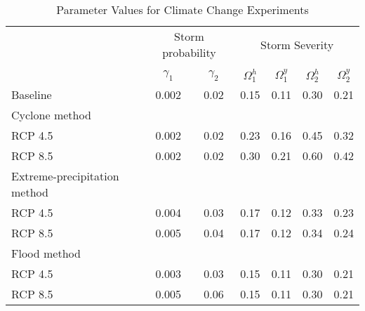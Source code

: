 \begin{table}[H] 
\singlespace 
\center 
\caption{Parameter Values for Climate Change Experiments} \label{tab:climate_params}
\vspace{-.1in} 
\begin{tabular}{l c c c c c c}\hline 
\hline 
& \multicolumn{2}{c}{Storm probability} & \multicolumn{4}{c}{Storm Severity} \\ 
		\cline{2-3} \cline{4-7} 
		&&&&&& \\[-2.5ex]  
 	& $\gamma_1$ & $\gamma_2$&  $\Omega^h_1$ & $\Omega^y_1$ & $\Omega^h_2$ & $\Omega^y_2$ \\ 
\hline 
Baseline &    0.002 &     0.02 &     0.15 &     0.11 &     0.30 &     0.21 \\Cyclone method \\ 
\hspace{1em} RCP 4.5 &    0.002 &     0.02 &     0.23 &     0.16 &     0.45 &     0.32 \\\hspace{1em} RCP 8.5 &    0.002 &     0.02 &     0.30 &     0.21 &     0.60 &     0.42 \\Extreme-precipitation method \\ 
\hspace{1em} RCP 4.5 &    0.004 &     0.03 &     0.17 &     0.12 &     0.33 &     0.23 \\\hspace{1em} RCP 8.5 &    0.005 &     0.04 &     0.17 &     0.12 &     0.34 &     0.24 \\Flood method \\ 
\hspace{1em} RCP 4.5 &    0.003 &     0.03 &     0.15 &     0.11 &     0.30 &     0.21 \\\hspace{1em} RCP 8.5 &    0.005 &     0.06 &     0.15 &     0.11 &     0.30 &     0.21 \\\hline 
\end{tabular}
\end{table} 
